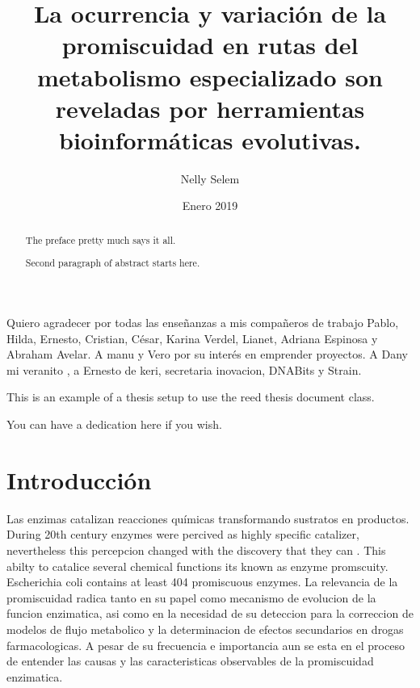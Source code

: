 \documentclass[12pt,twoside]{reedthesis}
\title{La ocurrencia y variación de la promiscuidad en rutas del metabolismo
especializado son reveladas por herramientas bioinformáticas evolutivas.}
\author{Nelly Selem}
\date{Enero 2019}
\begin{document}
      \maketitle
  
  \frontmatter %
  \pagestyle{empty} %

      \begin{acknowledgements}
      Quiero agradecer por todas las enseñanzas a mis compañeros de trabajo
      Pablo, Hilda, Ernesto, Cristian, César, Karina Verdel, Lianet, Adriana
      Espinosa y Abraham Avelar. A manu y Vero por su interés en emprender
      proyectos. A Dany mi veranito , a Ernesto de keri, secretaria inovacion,
      DNABits y Strain.
    \end{acknowledgements}
  
      \begin{preface}
      This is an example of a thesis setup to use the reed thesis document
      class.
    \end{preface}
  
      \hypersetup{linkcolor=black}
    \setcounter{tocdepth}{3}
    \tableofcontents
  
      \listoftables
  
      \listoffigures
  
      \begin{abstract}
      The preface pretty much says it all. \par  Second paragraph of abstract
      starts here.
    \end{abstract}
  
      \begin{dedication}
      You can have a dedication here if you wish.
    \end{dedication}
  
  \mainmatter %
  \pagestyle{fancyplain} %

  \chapter*{Introducción}\label{introduccion}
  
  Las enzimas catalizan reacciones químicas transformando sustratos en
  productos. During 20th century enzymes were percived as highly specific
  catalizer, nevertheless this percepcion changed with the discovery that
  they can . This abilty to catalice several chemical functions its known
  as enzyme promscuity. Escherichia coli contains at least 404 promiscuous
  enzymes. La relevancia de la promiscuidad radica tanto en su papel como
  mecanismo de evolucion de la funcion enzimatica, asi como en la
  necesidad de su deteccion para la correccion de modelos de flujo
  metabolico y la determinacion de efectos secundarios en drogas
  farmacologicas. A pesar de su frecuencia e importancia aun se esta en el
  proceso de entender las causas y las caracteristicas observables de la
  promiscuidad enzimatica.
  
\end{document}
